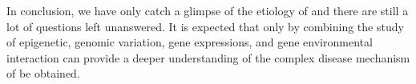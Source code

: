 \documentclass[12pt]{scrbook}
\newcommand*{\glng}{\glsentrylong}
\begin{document}
	In conclusion, we have only catch a glimpse of the etiology of \glng{scz} and there are still a lot of questions left unanswered.
	It is expected that only by combining the study of epigenetic, genomic variation, gene expressions, and gene environmental interaction can provide a deeper understanding of the complex disease mechanism of \glng{scz} be obtained.
	
	
	
	\backmatter
	\printbibliography[heading=bibintoc,title={Bibliography}]

\end{document}
